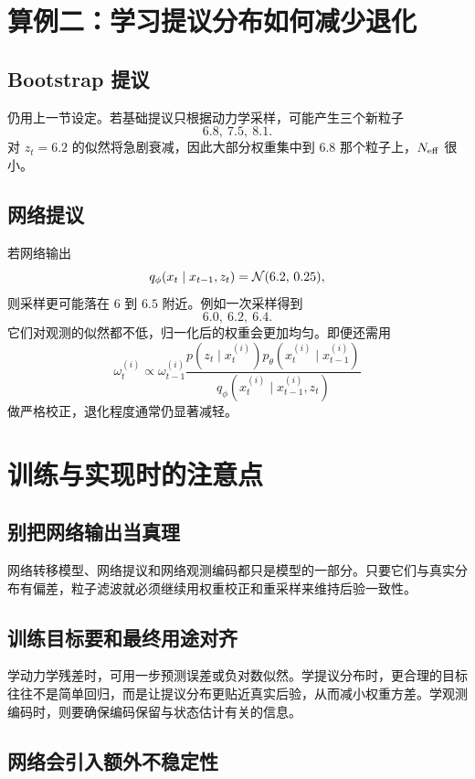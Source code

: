 \documentclass[12pt,a4paper]{ctexart}
\begin{document}
\section{算例二：学习提议分布如何减少退化}

\subsection{Bootstrap 提议}

仍用上一节设定。若基础提议只根据动力学采样，可能产生三个新粒子
\[
6.8,\ 7.5,\ 8.1.
\]
对 \(z_t=6.2\) 的似然将急剧衰减，因此大部分权重集中到 \(6.8\) 那个粒子上，\(N_{\mathrm{eff}}\) 很小。

\subsection{网络提议}

若网络输出
\[
q_\phi(x_t \mid x_{t-1}, z_t) = \mathcal{N}(6.2,\,0.25),
\]
则采样更可能落在 \(6\) 到 \(6.5\) 附近。例如一次采样得到
\[
6.0,\ 6.2,\ 6.4.
\]
它们对观测的似然都不低，归一化后的权重会更加均匀。即便还需用
\[
\omega_t^{(i)}
\propto \omega_{t-1}^{(i)}
\frac{p(z_t \mid x_t^{(i)}) p_\theta(x_t^{(i)} \mid x_{t-1}^{(i)})}
{q_\phi(x_t^{(i)} \mid x_{t-1}^{(i)}, z_t)}
\]
做严格校正，退化程度通常仍显著减轻。

\section{训练与实现时的注意点}

\subsection{别把网络输出当真理}

网络转移模型、网络提议和网络观测编码都只是模型的一部分。只要它们与真实分布有偏差，粒子滤波就必须继续用权重校正和重采样来维持后验一致性。

\subsection{训练目标要和最终用途对齐}

学动力学残差时，可用一步预测误差或负对数似然。学提议分布时，更合理的目标往往不是简单回归，而是让提议分布更贴近真实后验，从而减小权重方差。学观测编码时，则要确保编码保留与状态估计有关的信息。

\subsection{网络会引入额外不稳定性}
\end{document}
